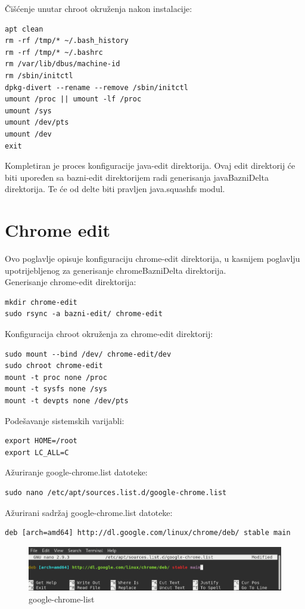 \documentclass[12pt,vi]{mitthesis}
\begin{document}
\noindent
Čišćenje unutar chroot okruženja nakon instalacije:
\begin{lstlisting}[style=BashInputStyle]
apt clean
rm -rf /tmp/* ~/.bash_history
rm -rf /tmp/* ~/.bashrc
rm /var/lib/dbus/machine-id
rm /sbin/initctl
dpkg-divert --rename --remove /sbin/initctl
umount /proc || umount -lf /proc
umount /sys
umount /dev/pts
umount /dev
exit
\end{lstlisting}
Kompletiran je proces konfiguracije java-edit direktorija. Ovaj edit direktorij će biti upoređen sa bazni-edit direktorijem radi generisanja javaBazniDelta direktorija.
Te će od delte biti pravljen java.squashfs modul.
\section*{Chrome edit}
\indent
Ovo poglavlje opisuje konfiguraciju chrome-edit direktorija, u kasnijem poglavlju upotrijebljenog za generisanje chromeBazniDelta direktorija.\\ 
\noindent
Generisanje chrome-edit direktorija:
\begin{lstlisting}[style=BashInputStyle]
mkdir chrome-edit
sudo rsync -a bazni-edit/ chrome-edit
\end{lstlisting}
\noindent
Konfiguracija chroot okruženja za chrome-edit direktorij:
\begin{lstlisting}[style=BashInputStyle]
sudo mount --bind /dev/ chrome-edit/dev
sudo chroot chrome-edit
mount -t proc none /proc
mount -t sysfs none /sys
mount -t devpts none /dev/pts
\end{lstlisting}
\noindent
Podešavanje sistemskih varijabli:
\begin{lstlisting}[style=BashInputStyle]
export HOME=/root
export LC_ALL=C
\end{lstlisting}
\noindent
Ažuriranje google-chrome.list datoteke:
\begin{lstlisting}[style=BashInputStyle]
sudo nano /etc/apt/sources.list.d/google-chrome.list
\end{lstlisting}
\noindent
Ažurirani sadržaj google-chrome.list datoteke:
\begin{lstlisting}[style=BashInputStyle]
deb [arch=amd64] http://dl.google.com/linux/chrome/deb/ stable main
\end{lstlisting}
\begin{figure}[!htb]
\centering
\includegraphics[width=\linewidth]{images/google-chrome-list.png}
\caption{google-chrome-list}
\end{figure}
\end{document}
